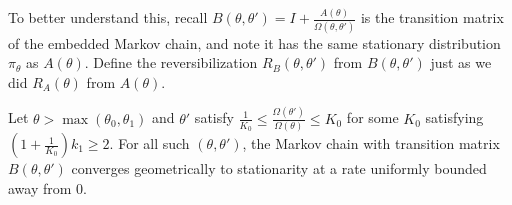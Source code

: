 To better understand this, recall $B(\theta, \theta') = I+\frac{A(\theta)}{\Omega(\theta, \theta')}$
is the transition matrix of the embedded Markov chain, and note 
it has the same stationary distribution $\pi_\theta$ as $A(\theta)$.
Define the reversibilization $R_B(\theta,\theta')$ from $B(\theta,\theta')$ 
just as we did $R_A(\theta)$ from $A(\theta)$. 
\begin{lemma}
  Let $\theta > \max (\theta_0, \theta_1)$ and $\theta'$ satisfy 
$\frac{1}{K_0} \le \frac{\Omega(\theta')}{\Omega(\theta)} \le K_0 $ for 
some $K_0$ %
satisfying $(1 + \frac{1}{K_0})k_1 \ge 2$. 
For all such $(\theta,\theta')$, the Markov chain with transition matrix 
$B(\theta,\theta')$ converges geometrically to stationarity at a rate 
uniformly bounded away from $0$.

  \label{lem:eig_lemma}
\end{lemma}
